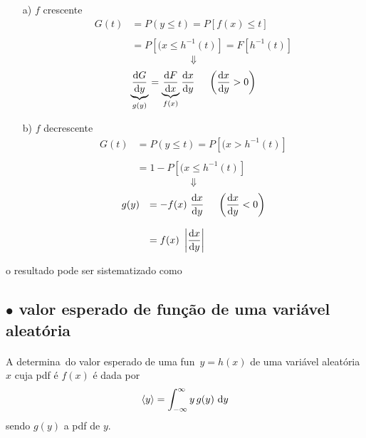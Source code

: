 \begin{itemize}
    \item[a)] $f$ crescente
    $$
\begin{array}{ll}
G(t)& =P(y\leq  t )  = P[ f(x)  \leq t ] \\
 & \\
     & = P [ (x\leq h^{-1} (t) ] = F [ h^{-1} (t) ]
\end{array}
$$
$$\Downarrow$$
$$\displaystyle  \underbrace{\frac{{\rm d}G}{{\rm d}y}}_{g(y)} =
  \underbrace{\frac{{\rm d}F}{{\rm d}x}}_{f(x)} \frac{{\rm d}x}{{\rm d}y}
  \ \ \ \ \left( \frac{{\rm d}x}{{\rm d}y} > 0 \right) $$

    \item[b)] $f$ decrescente
    $$
\begin{array}{ll}
G(t)& =P(y\leq t )  =  P [ (x > h^{-1} (t) ]  \\
  & \\
  & = 1 - P [ (x\leq h^{-1} (t) ]
\end{array}
$$
$$\Downarrow$$
$$ \begin{array}{ll}
\displaystyle  g(y) & = \displaystyle  - f(x) \ \frac{{\rm d}x}{{\rm d}y}
 \ \ \ \ \displaystyle  \left( \frac{{\rm d}x}{{\rm d}y} < 0 \right) \\
 & \\
   & \displaystyle  = f(x) \ \left| \frac{{\rm d}x}{{\rm d}y} \right|
   \end{array}
   $$
\end{itemize}

\noindent o   resultado  pode ser sistematizado como

\vspace{.5cm}
\centerline{}




\subsection*{$\bullet$ valor esperado  de fun\c{c}\~{a}o de uma   vari\'avel aleat\'oria}

 \paragraph*{}
   A  determina\cao\  do valor esperado de uma fun\cao\  $y=h(x)$ de uma vari\'avel aleat\'oria $x$ cuja  pdf \'{e}  $f(x)$ \'{e} dada por $$ \langle y \rangle = \int_{-\infty}^{\infty} y \,  g(y) \ {\rm d}y$$
sendo $g(y)$ a pdf  de $y$.

